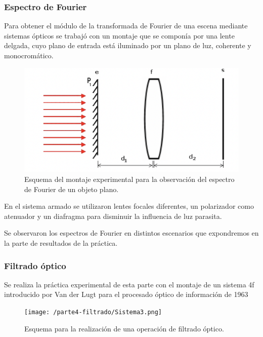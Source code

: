 \documentclass{./packages/optica-article}
\begin{document}
\subsubsection{ Espectro de Fourier}

	      Para obtener el módulo de la transformada de Fourier de una escena mediante sistemas ópticos se trabajó con un montaje que se componía por una lente delgada, cuyo plano de entrada está iluminado por un plano de luz, coherente y monocromático.

	      \begin{figure}[h]
		      \centering
		      \includegraphics[scale=1]{sistemaespectrodefourier.png}
		      \caption{Esquema del montaje experimental para la observación del espectro de Fourier de un objeto plano. }
		      \label{fouriersistema}
	      \end{figure}

	      En el sistema armado se utilizaron lentes focales diferentes, un polarizador como atenuador y un diafragma para disminuir la influencia de luz parasita.

	      Se observaron los espectros de Fourier en distintos escenarios que expondremos en la parte de resultados de la práctica.

\subsubsection{Filtrado óptico}

Se realiza la práctica experimental de esta parte con el montaje de un sistema 4f introducido por Van der Lugt para el procesado óptico de información de 1963

	      \begin{figure}[h]
		      \centering
		      \texttt{[image: /parte4-filtrado/Sistema3.png]}
		      \caption{Esquema para la realización de una operación de filtrado óptico.}
		      \label{filtradoopticosistema}
	      \end{figure}
\end{document}
